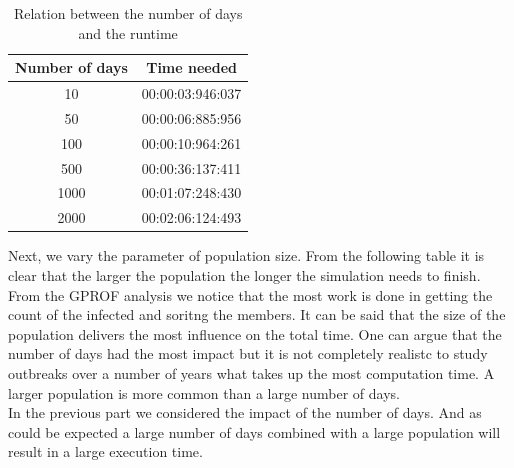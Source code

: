 \documentclass[runningheads]{llncs}
\begin{document}
	\begin{table}
		\caption{Relation between the number of days and the runtime}
		\begin{center}
			\begin{tabular}{ | c | c |}
				\hline
				Number of days & Time needed \\ \hline
				10 & 00:00:03:946:037 \\ \hline
				50 & 00:00:06:885:956 \\ \hline
				100 & 00:00:10:964:261 \\ \hline
				500 & 00:00:36:137:411 \\ \hline
				1000 & 00:01:07:248:430 \\ \hline
				2000 & 00:02:06:124:493 \\
				\hline	
			\end{tabular}
		\end{center}
	\end{table}
	
	\noindent
	Next, we vary the parameter of population size. From the following table it is clear that the larger the population the longer the simulation needs to finish. From the GPROF analysis we notice that the most work is done in getting the count of the infected and soritng the members. It can be said that the size of the population delivers the most influence on the total time. One can argue that the number of days had the most impact but it is not completely realistc to study outbreaks over a number of years what takes up the most computation time. A larger population is more common than a large number of days.
	\\
	In the previous part we considered the impact of the number of days. And as could be expected a large number of days combined with a large population will result in a large execution time.
	
\end{document}

